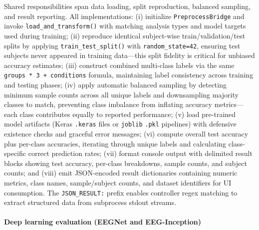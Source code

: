 \documentclass[12pt]{report}
\begin{document}
Shared responsibilities span data loading, split reproduction, balanced sampling, and result reporting. All implementations: (i) initialize \texttt{PreprocessBridge} and invoke \texttt{load\_and\_transform()} with matching analysis types and model targets used during training; (ii) reproduce identical subject-wise train/validation/test splits by applying \texttt{train\_test\_split()} with \texttt{random\_state=42}, ensuring test subjects never appeared in training data—this split fidelity is critical for unbiased accuracy estimates; (iii) construct combined multi-class labels via the same \texttt{groups * 3 + conditions} formula, maintaining label consistency across training and testing phases; (iv) apply automatic balanced sampling by detecting minimum sample counts across all unique labels and downsampling majority classes to match, preventing class imbalance from inflating accuracy metrics—each class contributes equally to reported performance; (v) load pre-trained model artifacts (Keras \texttt{.keras} files or \texttt{joblib} \texttt{.pkl} pipelines) with defensive existence checks and graceful error messages; (vi) compute overall test accuracy plus per-class accuracies, iterating through unique labels and calculating class-specific correct prediction rates; (vii) format console output with delimited result blocks showing test accuracy, per-class breakdowns, sample counts, and subject counts; and (viii) emit JSON-encoded result dictionaries containing numeric metrics, class names, sample/subject counts, and dataset identifiers for UI consumption. The \texttt{JSON\_RESULT:} prefix enables controller regex matching to extract structured data from subprocess stdout streams.

\paragraph{Deep learning evaluation (EEGNet and EEG-Inception)}\mbox{}
\end{document}
